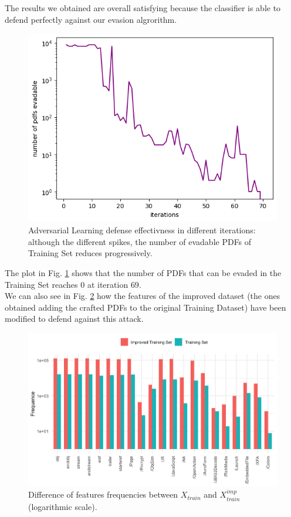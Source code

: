 \documentclass[twocolumn, switch]{article} %
\newcommand\x{0.7}
\begin{document}
The results we obtained are overall satisfying because the classifier is able to defend perfectly against our evasion algrorithm.

\begin{figure}[ht!]
	\centering
	\includegraphics[width=\x\linewidth]{adv_learning.png}
	\caption{Adversarial Learning defense effectivness in different iterations: although the different spikes, the number of evadable PDFs of Training Set reduces progressively.}
	\label{fig:advlearn}
\end{figure}
The plot in Fig. \ref{fig:advlearn} shows that the number of PDFs that can be evaded in the Training Set reaches $0$ at iteration $69$.\\
We can also see in Fig. \ref{fig:improved} how the features of the improved dataset (the ones obtained adding the crafted PDFs to the original Training Dataset) have been modified to defend against this attack.

\begin{figure}[ht!]
	\centering
	\includegraphics[width=\x\linewidth]{hist_train_improved.png}
	\caption{Difference of features frequencies between $X_{train}$ and $X_{train}^{imp}$ (logarithmic scale).}
	\label{fig:improved}
\end{figure}
\end{document}
